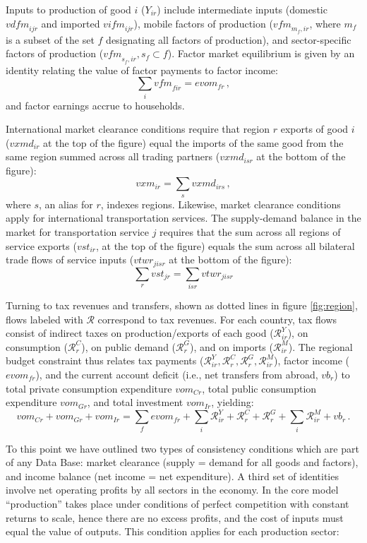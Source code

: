 Inputs to production of good $i$ ($Y_{ir}$) include intermediate inputs (domestic $\textit{vdfm}_{ijr}$ and imported $\textit{vifm}_{ijr}$), mobile factors of production ($\textit{vfm}_{m_{f},ir}$, where $m_{f}$ is a subset of the set $f$ designating all factors of production), and sector-specific factors of production ($\textit{vfm}_{s_{f},ir}, s_f \subset f$).
Factor market equilibrium is given by an identity relating the value of factor payments to factor income:
$$\sum_i \textit{vfm}_{fir} = \textit{evom}_{fr}\,,$$ and factor
earnings accrue to households.

International market clearance conditions require that region $r$ exports of good $i$ ($\textit{vxmd}_{ir}$ at the top of the figure) equal the imports of the same good from the same region summed across all trading partners ($\textit{vxmd}_{isr}$ at the bottom of the figure): $$\textit{vxm}_{ir} = \sum_s \textit{vxmd}_{irs}\,,$$ where $s$, an alias for $r$, indexes regions.
Likewise, market clearance conditions apply for international transportation services.
The supply-demand balance in the market for transportation service $j$ requires that the sum across all regions of service exports ($\textit{vst}_{ir}$, at the top of the figure) equals the sum across all bilateral trade flows of service inputs ($\textit{vtwr}_{jisr}$ at the bottom of the figure):
$$\sum_r \textit{vst}_{jr} = \sum_{isr} \textit{vtwr}_{jisr}$$

Turning to tax revenues and transfers, shown as dotted lines in figure \ref{fig:region}, flows labeled with $\mathcal{R}$ correspond to tax revenues.
For each country, tax flows consist of indirect taxes on production/exports of each good ($\mathcal{R}^Y_{ir}$), on consumption ($\mathcal{R}^C_r$), on public demand ($\mathcal{R}^G_r$), and on imports ($\mathcal{R}^M_{ir}$).
The regional budget constraint thus relates tax payments ($\mathcal{R}^Y_{ir}, \mathcal{R}^C_r, \mathcal{R}^G_r, \mathcal{R}^M_{ir}$), factor income ($\textit{evom}_{fr}$), and the current account deficit (i.e., net transfers from abroad, $\textit{vb}_r$) to total private consumption expenditure $\textit{vom}_{Cr}$, total public consumption expenditure $\textit{vom}_{Gr}$, and total investment $\textit{vom}_{Ir}$, yielding:
$$\textit{vom}_{Cr} + \textit{vom}_{Gr} + \textit{vom}_{Ir} = \sum_f
\textit{evom}_{fr} + \sum_i \mathcal{R}^Y_{ir} + \mathcal{R}^C_r + \mathcal{R}^G_r + \sum_i \mathcal{R}^M_{ir} + \textit{vb}_r\,.
$$

To this point we have outlined two types of consistency conditions which are part of any \GTAP Data Base: market clearance (supply = demand for all goods and factors), and income balance (net income = net expenditure).
A third set of identities involve net operating profits by all sectors in the economy.
In the core \GTAP model ``production'' takes place under conditions of perfect competition with constant returns to scale, hence there are no excess profits, and the cost of inputs must equal the value of outputs.
This condition applies for each production sector:

